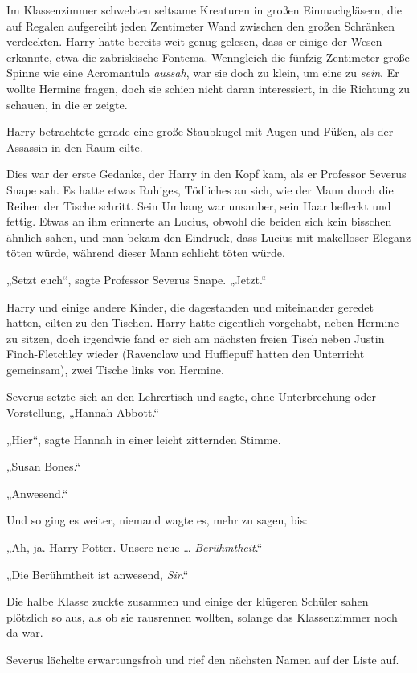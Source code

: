 Im Klassenzimmer schwebten seltsame Kreaturen in großen Einmachgläsern, die auf Regalen aufgereiht jeden Zentimeter Wand zwischen den großen Schränken verdeckten. Harry hatte bereits weit genug gelesen, dass er einige der Wesen erkannte, etwa die zabriskische Fontema. Wenngleich die fünfzig Zentimeter große Spinne wie eine Acromantula \emph{aussah}, war sie doch zu klein, um eine zu \emph{sein}. Er wollte Hermine fragen, doch sie schien nicht daran interessiert, in die Richtung zu schauen, in die er zeigte. 

Harry betrachtete gerade eine große Staubkugel mit Augen und Füßen, als der Assassin in den Raum eilte. 

Dies war der erste Gedanke, der Harry in den Kopf kam, als er Professor Severus Snape sah. Es hatte etwas Ruhiges, Tödliches an sich, wie der Mann durch die Reihen der Tische schritt. Sein Umhang war unsauber, sein Haar befleckt und fettig. Etwas an ihm erinnerte an Lucius, obwohl die beiden sich kein bisschen ähnlich sahen, und man bekam den Eindruck, dass Lucius mit makelloser Eleganz töten würde, während dieser Mann schlicht töten würde. 

„Setzt euch“, sagte Professor Severus Snape. „Jetzt.“ 

Harry und einige andere Kinder, die dagestanden und miteinander geredet hatten, eilten zu den Tischen. Harry hatte eigentlich vorgehabt, neben Hermine zu sitzen, doch irgendwie fand er sich am nächsten freien Tisch neben Justin Finch-Fletchley wieder (Ravenclaw und Hufflepuff hatten den Unterricht gemeinsam), zwei Tische links von Hermine. 

Severus setzte sich an den Lehrertisch und sagte, ohne Unterbrechung oder Vorstellung, „Hannah Abbott.“ 

„Hier“, sagte Hannah in einer leicht zitternden Stimme. 

„Susan Bones.“ 

„Anwesend.“ 

Und so ging es weiter, niemand wagte es, mehr zu sagen, bis: 

„Ah, ja. Harry Potter. Unsere neue … \emph{Berühmtheit}.“ 

„Die Berühmtheit ist anwesend, \emph{Sir}.“ 

Die halbe Klasse zuckte zusammen und einige der klügeren Schüler sahen plötzlich so aus, als ob sie rausrennen wollten, solange das Klassenzimmer noch da war. 

Severus lächelte erwartungsfroh und rief den nächsten Namen auf der Liste auf. 

